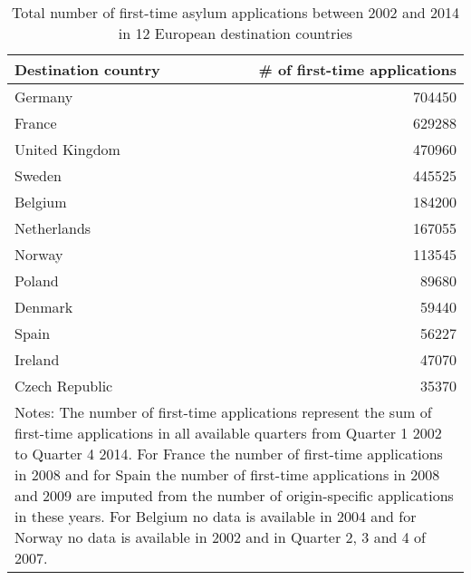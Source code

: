 \begin{table}[htbp]\centering
\caption{Total number of first-time asylum applications between 2002 and 2014 in 12 European destination countries}
\begin{tabular}{l r}
\hline \hline
\textbf{Destination country} & \textbf{\# of first-time  applications}  \\
\hline \hline
\smallskip
Germany &  704450 \\
\smallskip
France & 629288 \\
\smallskip
United Kingdom & 470960 \\
\smallskip
Sweden & 445525 \\
\smallskip
Belgium & 184200 \\
\smallskip
Netherlands & 167055 \\
\smallskip
Norway & 113545 \\
\smallskip 
Poland & 89680 \\
\smallskip
Denmark & 59440 \\
\smallskip
Spain & 56227 \\
\smallskip
Ireland & 47070 \\
\smallskip
Czech Republic & 35370 \\
\hline \hline
\multicolumn{2}{p{10cm}}{\footnotesize{Notes: The number of first-time applications represent the sum of  first-time applications in all available quarters from Quarter 1 2002 to Quarter 4 2014. For France the number of first-time applications in 2008 and for  Spain the number of first-time applications in 2008 and 2009 are imputed from the number of origin-specific applications in these years. For Belgium no data is available in 2004 and for Norway no data is available in 2002 and in Quarter 2, 3 and 4 of 2007.}}
\end{tabular}
\label{destination_countries}
\end{table}